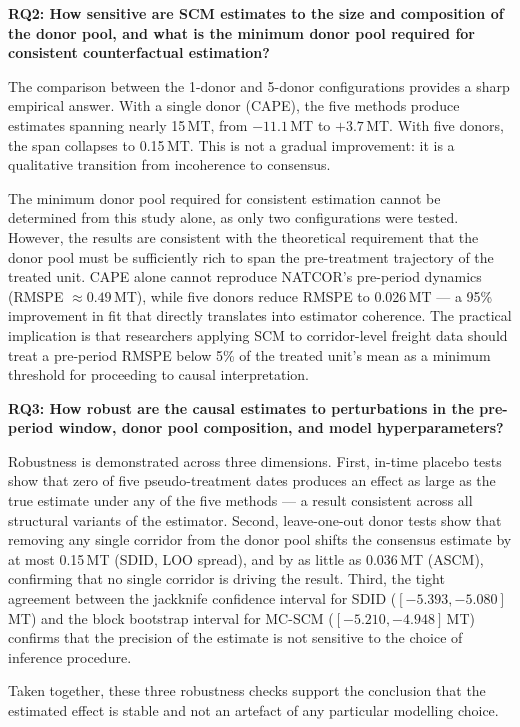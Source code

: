 \textbf{RQ2: How sensitive are SCM estimates to the size and
composition of the donor pool, and what is the minimum donor pool
required for consistent counterfactual estimation?}

The comparison between the 1-donor and 5-donor configurations
provides a sharp empirical answer.
With a single donor (CAPE), the five methods produce estimates
spanning nearly 15\,MT, from $-11.1$\,MT to $+3.7$\,MT.
With five donors, the span collapses to 0.15\,MT.
This is not a gradual improvement: it is a qualitative transition
from incoherence to consensus.

The minimum donor pool required for consistent estimation cannot be
determined from this study alone, as only two configurations were
tested.
However, the results are consistent with the theoretical requirement
that the donor pool must be sufficiently rich to span the
pre-treatment trajectory of the treated unit.
CAPE alone cannot reproduce NATCOR's pre-period dynamics
(RMSPE $\approx 0.49$\,MT), while five donors reduce RMSPE to
0.026\,MT --- a 95\% improvement in fit that directly translates
into estimator coherence.
The practical implication is that researchers applying SCM to
corridor-level freight data should treat a pre-period RMSPE below
5\% of the treated unit's mean as a minimum threshold for
proceeding to causal interpretation.

\textbf{RQ3: How robust are the causal estimates to perturbations
in the pre-period window, donor pool composition, and model
hyperparameters?}

Robustness is demonstrated across three dimensions.
First, in-time placebo tests show that zero of five pseudo-treatment
dates produces an effect as large as the true estimate under any
of the five methods --- a result consistent across all structural
variants of the estimator.
Second, leave-one-out donor tests show that removing any single
corridor from the donor pool shifts the consensus estimate by at
most 0.15\,MT (SDID, LOO spread), and by as little as 0.036\,MT
(ASCM), confirming that no single corridor is driving the result.
Third, the tight agreement between the jackknife confidence interval
for SDID ($[-5.393, -5.080]$\,MT) and the block bootstrap interval
for MC-SCM ($[-5.210, -4.948]$\,MT) confirms that the precision of
the estimate is not sensitive to the choice of inference procedure.

Taken together, these three robustness checks support the conclusion
that the estimated effect is stable and not an artefact of any
particular modelling choice.

